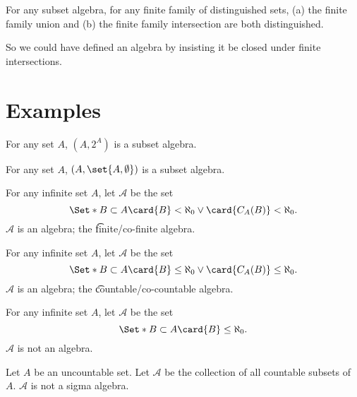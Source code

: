 \begin{proposition}
For any subset algebra,
for any finite family of distinguished sets,
(a) the finite family union and
(b) the finite family intersection
are both distinguished.
\end{proposition}

So we could have defined an algebra
by insisting it be closed under finite
intersections.

\section*{Examples}

\begin{example}
For any set $A$, $(A, 2^{A})$ is a subset algebra.
\end{example}

\begin{example}
For any set $A$, $(A, \set{A, \emptyset})$ is a subset algebra.
\end{example}

\begin{example}
For any infinite set $A$, let $\mathcal{A} $ be the set
\[
\Set*{
B \subset A
}{
\card{B} < \aleph_0 \lor
\card{C_{A}(B)} < \aleph_0
}.
\]
$\mathcal{A} $ is an algebra;
the
\t{finite/co-finite algebra}.
\end{example}

\begin{example}
For any infinite set $A$, let $\mathcal{A} $ be the set
\[
\Set*{
B \subset A
}{
\card{B} \leq \aleph_0 \lor
\card{C_{A}(B)} \leq \aleph_0
}.
\]
$\mathcal{A} $ is an algebra; the \t{countable/co-countable algebra}.
\end{example}

\begin{example}
For any infinite set $A$, let $\mathcal{A} $ be the set
\[
\Set*{
B \subset A
}{
\card{B} \leq \aleph_0
}.
\]
$\mathcal{A} $ is not an algebra.
\end{example}

\begin{example}
Let $A$ be an uncountable set.
Let $\mathcal{A} $ be the collection of all countable subsets of $A$.
$\mathcal{A} $ is not a sigma algebra.
\end{example}
